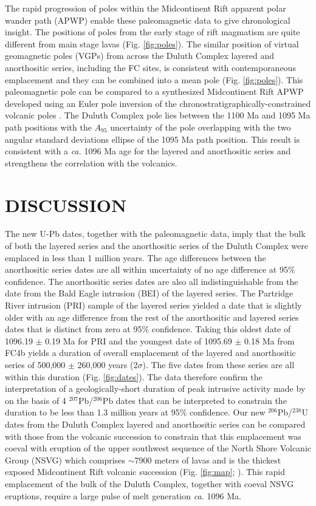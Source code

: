 \documentclass[11pt,letterpaper]{article}
\begin{document}
The rapid progression of poles within the Midcontinent Rift apparent polar wander path (APWP) enable these paleomagnetic data to give chronological insight. The positions of poles from the early stage of rift magmatism are quite different from main stage lavas (Fig. \ref{fig:poles}). The similar position of virtual geomagnetic poles (VGPs) from across the Duluth Complex layered and anorthositic series, including the FC sites, is consistent with contemporaneous emplacement and they can be combined into a mean pole (Fig. \ref{fig:poles}). This paleomagnetic pole can be compared to a synthesized Midcontinent Rift APWP developed using an Euler pole inversion of the chronostratigraphically-constrained volcanic poles \citep{Swanson-Hysell2019a}. The Duluth Complex pole lies between the 1100 Ma and 1095 Ma path positions with the $A_{95}$ uncertainty of the pole overlapping with the two angular standard deviations ellipse of the 1095 Ma path position. This result is consistent with a \textit{ca.} 1096 Ma age for the layered and anorthositic series and strengthens the correlation with the volcanics.

\section*{DISCUSSION}

The new U-Pb dates, together with the paleomagnetic data, imply that the bulk of both the layered series and the anorthositic series of the Duluth Complex were emplaced in less than 1 million years. The age differences between the anorthositic series dates are all within uncertainty of no age difference at 95$\%$ confidence. The anorthositic series dates are also all indistinguishable from the date from the Bald Eagle intrusion (BEI) of the layered series. The Partridge River intrusion (PRI) sample of the layered series yielded a date that is slightly older with an age difference from the rest of the anorthositic and layered series dates that is distinct from zero at 95$\%$ confidence. Taking this oldest date of 1096.19 $\pm$ 0.19 Ma for PRI and the youngest date of 1095.69 $\pm$ 0.18 Ma from FC4b yields a duration of overall emplacement of the layered and anorthositic series of 500,000 $\pm$ 260,000 years (2$\sigma$). The five dates from these series are all within this duration (Fig. \ref{fig:dates}). The data therefore confirm the interpretation of a geologically-short duration of peak intrusive activity made by \cite{Paces1993a} on the basis of 4 $^{207}$Pb/$^{206}$Pb dates that can be interpreted to constrain the duration to be less than 1.3 million years at 95$\%$ confidence. Our new $^{206}$Pb/$^{238}$U dates from the Duluth Complex layered and anorthositic series can be compared with those from the volcanic succession to constrain that this emplacement was coeval with eruption of the upper southwest sequence of the North Shore Volcanic Group (NSVG) which comprises $\sim$7900 meters of lavas and is the thickest exposed Midcontinent Rift volcanic succession (Fig. \ref{fig:map}; \citealp{Green2011a,Swanson-Hysell2019a}). This rapid emplacement of the bulk of the Duluth Complex, together with coeval NSVG eruptions, require a large pulse of melt generation \textit{ca.} 1096 Ma.
\end{document}
